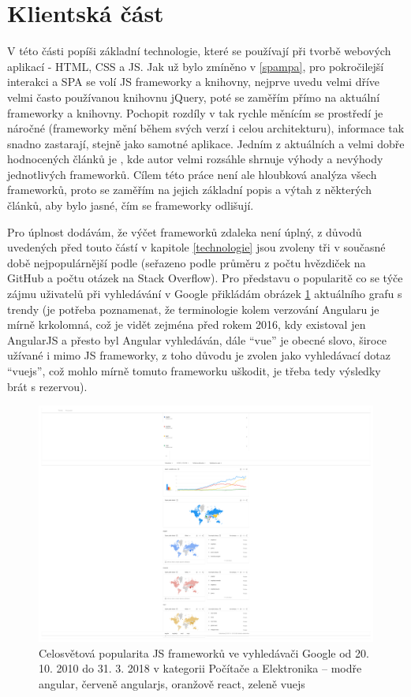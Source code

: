     \section{Klientská část}
    V této části popíši základní technologie, které se používají při tvorbě webových aplikací - HTML, CSS a JS. Jak už bylo zmíněno v \ref{spampa}, pro pokročilejší interakci a SPA se volí JS frameworky a knihovny, nejprve uvedu velmi dříve velmi často používanou knihovnu jQuery, poté se zaměřím přímo na aktuální frameworky a knihovny. Pochopit rozdíly v tak rychle měnícím se prostředí je náročné (frameworky mění během svých verzí i celou architekturu), informace tak snadno zastarají, stejně jako samotné aplikace. Jedním z aktuálních a velmi dobře hodnocených článků je \cite{js-fw2}, kde autor velmi rozsáhle shrnuje výhody a nevýhody jednotlivých frameworků. Cílem této práce není ale hloubková analýza všech frameworků, proto se zaměřím na jejich základní popis a výtah z některých článků, aby bylo jasné, čím se frameworky odlišují.
    
    Pro úplnost dodávám, že výčet frameworků zdaleka není úplný, z důvodů uvedených před touto částí v kapitole \ref{technologie} jsou zvoleny tři v současné době nejpopulárnější podle \cite{hot-frameworks} (seřazeno podle průměru z počtu hvězdiček na GitHub a počtu otázek na Stack Overflow). Pro představu o popularitě co se týče zájmu uživatelů při vyhledávání v Google přikládám obrázek \ref{fig:js-frameworks} aktuálního grafu s trendy (je potřeba poznamenat, že terminologie kolem verzování Angularu je mírně krkolomná, což je vidět zejména před rokem 2016, kdy existoval jen AngularJS a přesto byl Angular vyhledáván, dále \enquote{vue} je obecné slovo, široce užívané i mimo JS frameworky, z toho důvodu je zvolen jako vyhledávací dotaz \enquote{vuejs}, což mohlo mírně tomuto frameworku uškodit, je třeba tedy výsledky brát s rezervou).
    
    \begin{figure}\centering
    	\includegraphics[width=1\textwidth]{img/js-frameworks}
    	\caption[Popularita JS frameworků ve vyhledávači Google]{Celosvětová popularita JS frameworků ve vyhledávači Google od 20. 10. 2010 do 31. 3. 2018 v kategorii Počítače a Elektronika -- modře angular, červeně angularjs, oranžově react, zeleně vuejs \cite{trends-google}}\label{fig:js-frameworks}
    \end{figure}
    
